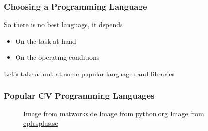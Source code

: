 \documentclass[xetex,professionalfont]{beamer}
\renewcommand\emph[1]{\textcolor{tuwcvl_inf_red}{#1}}
\begin{document}

\begin{frame}
\frametitle{Choosing a Programming Language}

So there is \emph{no best language}, it depends
\begin{itemize}
	\item On the task at hand %
	\item On the operating conditions %
\end{itemize}

\medskip
Let's take a look at some popular languages and libraries

\end{frame}


\begin{frame}
\frametitle{Popular CV Programming Languages}

\begin{figure}
\centering
{
	{\centering Image from \url{matworks.de}}}\quad
{
	{\centering Image from \url{python.org}}}\quad
{
	{\centering Image from \url{cplusplus.se}}}
\end{figure}

\end{frame}

\end{document}
